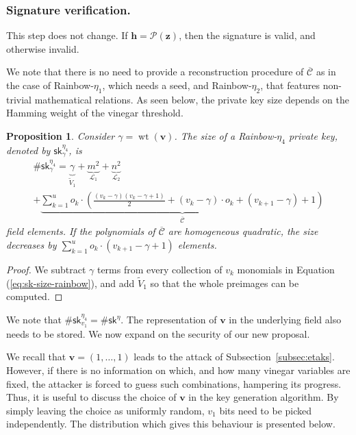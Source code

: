 \documentclass[12pt, a4paper, oneside]{memoir}
\DeclareMathOperator*{\wt}{wt}
\newtheorem{proposition}[theorem]{Proposition}
\theoremstyle{definition}
\begin{document}
\subsubsection{Signature verification.}

This step does not change. If $\mathbf{h} = \mathcal{P}(\mathbf{z})$, then the signature is valid, and otherwise invalid.

We note that there is no need to provide a reconstruction procedure of $\overline{\mathcal{C}}$ as in the case of Rainbow-$\eta_{1}$, which needs a seed, and Rainbow-$\eta_{2}$, that features non-trivial mathematical relations. As seen below, the private key size depends on the Hamming weight of the vinegar threshold.
\begin{proposition}
  Consider $\gamma = \wt(\mathbf{v})$. The size of a Rainbow-$\eta_{4}$ private key, denoted by $\textsf{sk}^{\eta_{4}}_{\gamma}$, is
  \begin{multline}
    \#\textsf{sk}^{\eta_{4}}_{\gamma} = \underbrace{\gamma}_{\widetilde{V}_{1}}
      + \underbrace{m^{2}}_{\mathcal{L}_{1}}
      + \underbrace{n^{2}}_{\mathcal{L}_{2}} \\
      + \underbrace{\sum_{k = 1}^{u} o_{k} \cdot \left( \frac{(v_{k} - \gamma)(v_{k} - \gamma + 1)}{2}
        + (v_{k} - \gamma) \cdot o_{k} + (v_{k + 1} - \gamma) + 1 \right)}_{\overline{\mathcal{C}}}
  \end{multline}
  field elements. If the polynomials of $\overline{\mathcal{C}}$ are homogeneous quadratic, the size decreases by $\sum_{k = 1}^{u} o_{k} \cdot (v_{k + 1} - \gamma + 1)$ elements.
\end{proposition}
\begin{proof}
  We subtract $\gamma$ terms from every collection of $v_{k}$ monomials in Equation (\ref{eq:sk-size-rainbow}), and add $\widetilde{V}_{1}$ so that the whole preimages can be computed.
\end{proof}
We note that $\#\textsf{sk}^{\eta_{4}}_{v_{1}} = \#\textsf{sk}^{\eta}$. The representation of $\mathbf{v}$ in the underlying field also needs to be stored. We now expand on the security of our new proposal.

We recall that $\mathbf{v} = (1, \dots, 1)$ leads to the attack of Subsection~\ref{subsec:etaks}. However, if there is no information on which, and how many vinegar variables are fixed, the attacker is forced to guess such combinations, hampering its progress. Thus, it is useful to discuss the choice of $\mathbf{v}$ in the key generation algorithm. By simply leaving the choice as uniformly random, $v_{1}$ bits need to be picked independently. The distribution which gives this behaviour is presented below.
\end{document}
